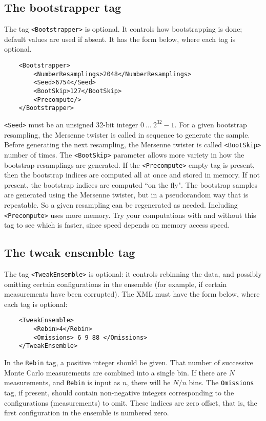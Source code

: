 \documentclass[12pt]{article}
\newcommand{\vb}{\texttt}
\begin{document}
\subsection{The bootstrapper tag}
The tag \vb{<Bootstrapper>} is optional.  It controls how bootstrapping
is done; default values are used if absent.  It has the form below, where each 
tag is optional.  
\begin{verbatim}
    <Bootstrapper>
        <NumberResamplings>2048</NumberResamplings>
        <Seed>6754</Seed>
        <BootSkip>127</BootSkip>
        <Precompute/>
    </Bootstrapper>
\end{verbatim}
\vb{<Seed>} must be an unsigned 32-bit integer $0\ \dots\ 2^{32}-1$.
For a given bootstrap resampling, the Mersenne twister is
called in sequence to generate the sample. Before generating
the next resampling, the Mersenne twister is called \vb{<BootSkip>}
number of times. The \vb{<BootSkip>} parameter allows more variety
in how the bootstrap resamplings are generated. If the \vb{<Precompute>} 
empty tag is present, then the bootstrap indices are computed all at once 
and stored in memory. If not present, the bootstrap indices are computed 
``on the fly". The bootstrap samples are generated using the Mersenne
twister, but in a pseudorandom way that is repeatable. So a given resampling 
can be regenerated as needed. Including \vb{<Precompute>} uses more memory.
Try your computations with and without this tag to see which is faster, 
since speed depends on memory access speed.

\subsection{The tweak ensemble tag}
The tag \vb{<TweakEnsemble>} is optional: it controls rebinning the data, 
and possibly omitting certain configurations in the ensemble (for example,
if certain measurements have been corrupted).  The XML must have the form 
below, where each tag is optional:
\begin{verbatim}
    <TweakEnsemble>
        <Rebin>4</Rebin>
        <Omissions> 6 9 88 </Omissions>
    </TweakEnsemble>
\end{verbatim}
In the \vb{Rebin} tag, a positive integer should be given.  That number of
successive Monte Carlo measurements are combined into a single bin.
If there are $N$ measurements, and \vb{Rebin} is input as $n$,
there will be $N/n$ bins. The \vb{Omissions} tag, if present,
should contain non-negative integers corresponding to the configurations
(measurements) to omit. These indices are zero offset, that is, the
first configuration in the ensemble is numbered zero.
\end{document}
